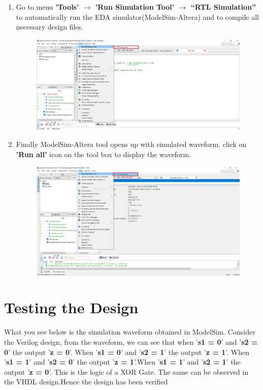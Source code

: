 \documentclass[12pt]{article}
\begin{document}
\begin{enumerate}
        
        \item Go to menu \textbf{'Tools' $\rightarrow$ 'Run Simulation Tool' $\rightarrow$
         “RTL Simulation”} to automatically run the EDA simulator(ModelSim-Altera) and to compile all necessary design files.
            \begin{figure}[H]
                \centering
                \includegraphics[width=14cm,keepaspectratio]{simu5.png}
            \end{figure}
    \newpage
        \item Finally ModelSim-Altera tool opens up with simulated waveform. click on \textbf{'Run all'} icon on the tool box to display the waveform.
            \begin{figure}[H]
                \centering
                \includegraphics[width=14cm,keepaspectratio]{tws9.png}
            \end{figure}
  
        
    \end{enumerate}
 \newpage
 
 
\section{Testing the Design}
What you see below is the simulation waveform obtained in ModelSim. Consider the Verilog design, from the waveform, we can see that when '\textbf{s1 = 0}' and '\textbf{s2 = 0}' the output '\textbf{z = 0}'. When '\textbf{s1 = 0}' and '\textbf{s2 = 1}' the output '\textbf{z = 1}'. When '\textbf{s1 = 1}' and '\textbf{s2 = 0}' the output '\textbf{z = 1}'.When '\textbf{s1 = 1}' and '\textbf{s2 = 1}' the output '\textbf{z = 0}'. This is the logic of a XOR Gate. The same can be observed in the VHDL design.Hence the design has been verified
\end{document}
